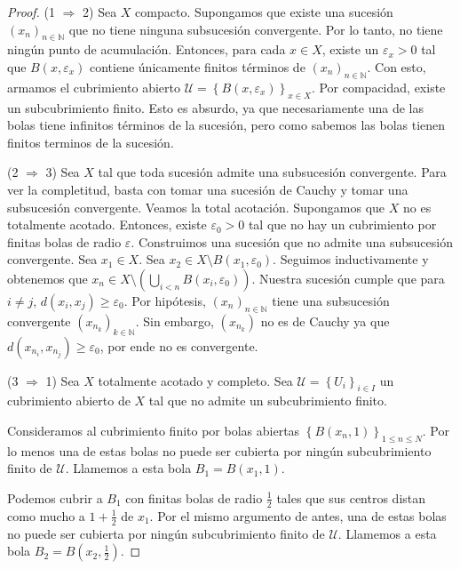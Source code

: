 \begin{proof}
	(1 $\Rightarrow$ 2) Sea $X$ compacto. Supongamos que existe una sucesión $(x_n)_{n \in \mathbb{N}}$ que no tiene ninguna subsucesión convergente. Por lo tanto, no tiene ningún punto de acumulación. Entonces, para cada $x \in X$, existe un $\varepsilon_x > 0$ tal que $B(x, \varepsilon_x)$ contiene únicamente finitos términos de $(x_n)_{n \in \mathbb{N}}$. Con esto, armamos el cubrimiento abierto $\mathcal{U} = \left\{ B(x, \varepsilon_x) \right\}_{x \in X}$. Por compacidad, existe un subcubrimiento finito. Esto es absurdo, ya que necesariamente una de las bolas tiene infinitos términos de la sucesión, pero como sabemos las bolas tienen finitos terminos de la sucesión.

	(2 $\Rightarrow$ 3) Sea $X$ tal que toda sucesión admite una subsucesión convergente. Para ver la completitud, basta con tomar una sucesión de Cauchy y tomar una subsucesión convergente.
	Veamos la total acotación. Supongamos que $X$ no es totalmente acotado. Entonces, existe $\varepsilon_0 > 0$ tal que no hay un cubrimiento por finitas bolas de radio $\varepsilon$. Construimos una sucesión que no admite una subsucesión convergente. Sea $x_1 \in X$. Sea $x_2 \in X \setminus B(x_1, \varepsilon_0)$. Seguimos inductivamente y obtenemos que $x_n \in X \setminus \left( \bigcup_{i < n} B(x_i, \varepsilon_0)\right)$. Nuestra sucesión cumple que para $i \neq j$, $d(x_i, x_j) \geq \varepsilon_0$. Por hipótesis, $(x_n)_{n \in \mathbb{N}}$ tiene una subsucesión convergente $(x_{n_k})_{k \in \mathbb{N}}$. Sin embargo, $(x_{n_k})$ no es de Cauchy ya que $d(x_{n_{i}}, x_{n_j}) \geq \varepsilon_0$, por ende no es convergente.

	(3 $\Rightarrow$ 1) Sea $X$ totalmente acotado y completo. Sea $\mathcal{U} = \left\{ U_i \right\}_{i \in I}$ un cubrimiento abierto de $X$ tal que no admite un subcubrimiento finito.

	Consideramos al cubrimiento finito por bolas abiertas $\left\{ B(x_n, 1) \right\}_{1 \leq n \leq N}$. Por lo menos una de estas bolas no puede ser cubierta por ningún subcubrimiento finito de $\mathcal{U}$. Llamemos a esta bola $B_1 = B(x_1, 1)$.

	Podemos cubrir a $B_1$ con finitas bolas de radio $\frac{1}{2}$ tales que sus centros distan como mucho a $1 + \frac{1}{2}$ de $x_1$. Por el mismo argumento de antes, una de estas bolas no puede ser cubierta por ningún subcubrimiento finito de $\mathcal{U}$. Llamemos a esta bola $B_2 = B(x_2, \frac{1}{2})$.


\end{proof}
